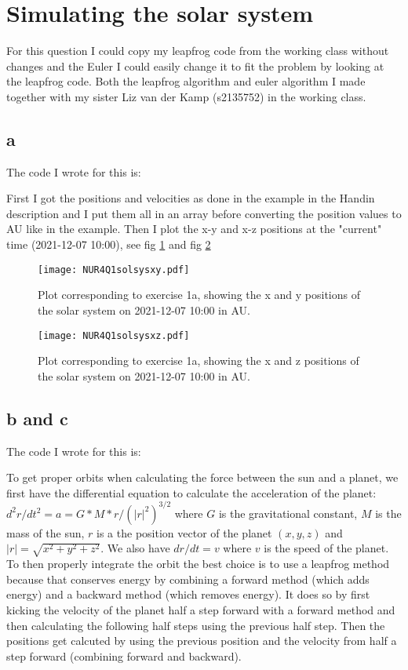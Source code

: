 \section{Simulating the solar system}

For this question I could copy my leapfrog code from the working class without changes and the Euler I could easily change it to fit the problem by looking at the leapfrog code. 
Both the leapfrog algorithm and euler algorithm I made together with my sister Liz van der Kamp (s2135752) in the working class. 

\subsection*{a}

The code I wrote for this is:


First I got the positions and velocities as done in the example in the Handin description and I put them all in an array before converting the position values to AU like in the example. Then I plot the x-y and x-z positions at the "current" time (2021-12-07 10:00), see fig \ref{fig:fig1} and fig \ref{fig:fig2}

\begin{figure}[h!]
  \centering
  \texttt{[image: NUR4Q1solsysxy.pdf]}
  \caption{Plot corresponding to exercise 1a, showing  the x and y positions of the solar system on 2021-12-07 10:00 in AU.}
  \label{fig:fig1}
\end{figure} 


\begin{figure}[h!]
  \centering
  \texttt{[image: NUR4Q1solsysxz.pdf]}
  \caption{Plot corresponding to exercise 1a, showing  the x and z positions of the solar system on 2021-12-07 10:00 in AU.}
  \label{fig:fig2}
\end{figure} 


\subsection*{b and c}

The code I wrote for this is:


To get proper orbits when calculating the force between the sun and a planet, we first have the differential equation to calculate the acceleration of the planet: $d^2r/dt^2 = a = G*M*r/(|r|^2)^{3/2}$ where $G$ is the gravitational constant, $M$ is the mass of the sun, $r$ is a the position vector of the planet $(x,y,z)$ and $|r| = \sqrt{x^2 + y^2 + z^2}$. 
We also have $dr/dt = v$ where $v$ is the speed of the planet. To then properly integrate the orbit the best choice is to use a leapfrog method because that conserves energy by combining a forward method (which adds energy) and a backward method (which removes energy). 
It does so by first kicking the velocity of the planet half a step forward with a forward method and then calculating the following half steps using the previous half step. Then the positions get calcuted by using the previous position and the velocity from half a step forward (combining forward and backward).

